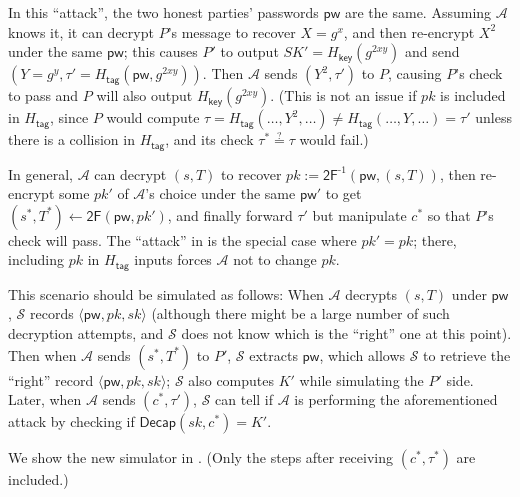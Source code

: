 \documentclass{article}
\theoremstyle{plain}
\theoremstyle{definition}
\theoremstyle{remark}
\newcommand{\adv}{\mathcal{A}}
\renewcommand{\sim}{\mathcal{S}}
\newcommand{\Decap}{\mathsf{Decap}}
\newcommand{\Hkey}{H_\mathsf{key}}
\newcommand{\Htag}{H_\mathsf{tag}}
\newcommand{\pw}{\mathsf{pw}}
\begin{document}
In this ``attack'', the two honest parties' passwords $\pw$ are the same. Assuming $\adv$ knows it, it can decrypt $P$'s message to recover $X = g^x$, and then re-encrypt $X^2$ under the same $\pw$; this causes $P'$ to output $SK' = \Hkey(g^{2xy})$ and send $(Y = g^y, \tau' = \Htag(\pw,g^{2xy}))$. Then $\adv$ sends $(Y^2,\tau')$ to $P$, causing $P$'s check to pass and $P$ will also output $\Hkey(g^{2xy})$. (This is not an issue if $pk$ is included in $\Htag$, since $P$ would compute $\tau = \Htag(\dots,Y^2,\dots) \neq \Htag(\dots,Y,\dots) = \tau'$ unless there is a collision in $\Htag$, and its check $\tau^* \stackrel{?}{=} \tau$ would fail.)

In general, $\adv$ can decrypt $(s,T)$ to recover $pk := \mathsf{2F}^{\text{-}1}(\pw,(s,T))$, then re-encrypt some $pk'$ of $\adv$'s choice under the same $\pw'$ to get $(s^*,T^*) \gets \mathsf{2F}(\pw,pk')$, and finally forward $\tau'$ but manipulate $c^*$ so that $P$'s check will pass. The ``attack'' in  is the special case where $pk' = pk$; there, including $pk$ in $\Htag$ inputs forces $\adv$ not to change $pk$.

This scenario should be simulated as follows: When $\adv$ decrypts $(s,T)$ under $\pw$, $\sim$ records $\langle\pw,pk,sk\rangle$ (although there might be a large number of such decryption attempts, and $\sim$ does not know which is the ``right'' one at this point). Then when $\adv$ sends $(s^*,T^*)$ to $P'$, $\sim$ extracts $\pw$, which allows $\sim$ to retrieve the ``right'' record $\langle\pw,pk,sk\rangle$; $\sim$ also computes $K'$ while simulating the $P'$ side. Later, when $\adv$ sends $(c^*,\tau')$, $\sim$ can tell if $\adv$ is performing the aforementioned attack by checking if $\Decap(sk,c^*) = K'$.

We show the new simulator in . (Only the steps after receiving $(c^*,\tau^*)$ are included.)
\end{document}
